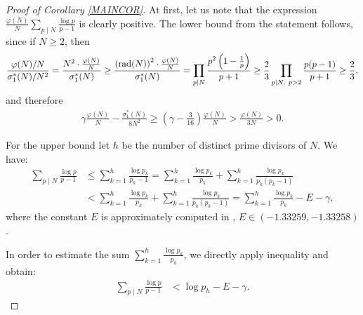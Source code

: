 \documentclass[a4paper]{amsart}
\newcommand{\1}{\mathbbm{1}}
\begin{document}
\begin{proof}[Proof of Corollary \ref{MAINCOR}]
At first, let us note that the expression $\frac{\varphi (N)}{N}\sum_{p\mid N}\frac{\log p}{p-1}$ is clearly positive. The lower bound from the statement follows, since if $N\geq 2$, then
\begin{align}\label{bound2/3}
\frac{\varphi(N)/N}{\sigma_{1}^{*}(N)/N^{2}}=\frac{N^{2}\cdot \frac{\varphi (N)}{N}}{\sigma_{1}^{*}(N)} \geq \frac{\left({\rm rad} (N) \right)^{2} \cdot \frac{\varphi(N)}{N}}{\sigma_{1}^{*}(N)} = \prod_{p\mid N} \frac{p^{2}\left(1-\frac{1}{p}\right)}{p+1} \geq \frac{2}{3}\prod_{p\mid N,\ p>2} \frac{p(p-1)}{p+1}\geq \frac{2}{3},
\end{align}
and therefore 
\begin{align*}
\gamma \frac{\varphi (N)}{N} - \frac{\sigma_{1}^{*}(N)}{8N^{2}} \geq \left(\gamma - \frac{3}{16}\right)\frac{\varphi (N)}{N} > \frac{\varphi (N)}{3N} > 0.
\end{align*}

For the upper bound let $h$ be the number of distinct prime divisors of $N$. We have:
\begin{align*}
\sum_{p\mid N}\frac{\log p}{p-1} & \leq \sum_{k=1}^{h}\frac{\log p_{k}}{p_{k}-1} =\sum_{k=1}^{h}\frac{\log p_{k}}{p_{k}} + \sum_{k=1}^{h}\frac{\log p_{k}}{p_{k}(p_{k}-1)} \\ 
& < \sum_{k=1}^{h}\frac{\log p_{k}}{p_{k}} + \sum_{k=1}^{h}\frac{\log p_{k}}{p_{k}(p_{k}-1)} = \sum_{k=1}^{h}\frac{\log p_{k}}{p_{k}} -E-\gamma ,
\end{align*}
where the constant $E$ is approximately computed in \cite[(2.8) and (2.11)]{RS}, $E\in (-1.33259,-1.33258)$. 

In order to estimate the sum $\sum_{k=1}^{h}\frac{\log p_{k}}{p_{k}}$, we directly apply inequality \cite[(3.24)]{RS} and obtain:
\begin{align*}
\sum_{p\mid N}\frac{\log p}{p-1} & < \log p_{h} - E - \gamma.
\end{align*}


\end{proof}
\end{document}
